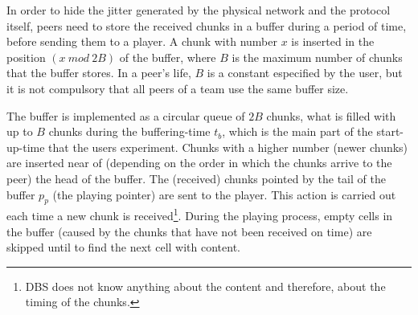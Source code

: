 

\label{sec:buffering_chunks}

In order to hide the jitter generated by the physical network and the
protocol itself, peers need to store the received chunks in a buffer
during a period of time, before sending them to a player. A chunk with
number $x$ is inserted in the position $(x~\mathit{mod}~2B)$ of the
buffer, where $B$ is the maximum number of chunks that the buffer
stores. In a peer's life, $B$ is a constant especified by the user,
but it is not compulsory that all peers of a team use the same buffer
size.

The buffer is implemented as a circular queue of $2B$ chunks, what is
filled with up to $B$ chunks during the \gls{buffering-time} $t_b$,
which is the main part of the \gls{start-up-time} that the users
experiment. Chunks with a higher number (newer chunks) are inserted
near of (depending on the order in which the chunks arrive to the
peer) the head of the buffer. The (received) chunks pointed by the tail
of the buffer $p_p$ (the playing pointer) are sent to the player. This
action is carried out each time a new chunk is received\footnote{DBS
  does not know anything about the content and therefore, about the
  timing of the chunks.}. During the playing process, empty cells in
the buffer (caused by the chunks that have not been received on time)
are skipped until to find the next cell with content.

